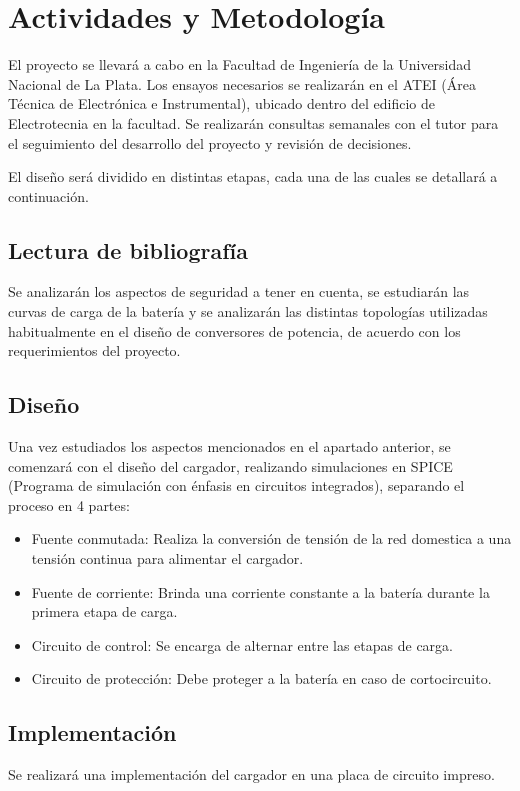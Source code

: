 \section{Actividades y Metodología}
El proyecto se llevará a cabo en la Facultad de Ingeniería de la Universidad Nacional de La Plata.
Los ensayos necesarios se realizarán en el ATEI (Área Técnica de Electrónica e Instrumental),
ubicado dentro del edificio de Electrotecnia en la facultad.
Se realizarán consultas semanales con el tutor para el seguimiento del desarrollo del proyecto y revisión de decisiones.

El diseño será dividido en distintas etapas, cada una de las cuales se detallará a continuación.

\subsection{Lectura de bibliografía}
Se analizarán los aspectos de seguridad a tener en cuenta,
se estudiarán las curvas de carga de la batería y
se analizarán las distintas topologías utilizadas habitualmente en el diseño de conversores de potencia,
de acuerdo con los requerimientos del proyecto.

\subsection{Diseño}
Una vez estudiados los aspectos mencionados en el apartado anterior,
se comenzará con el diseño del cargador,
realizando simulaciones en SPICE (Programa de simulación con énfasis en circuitos integrados),
separando el proceso en 4 partes:
\begin{itemize}
    \item Fuente conmutada: Realiza la conversión de tensión de la red domestica a una tensión continua para alimentar el cargador.
    \item Fuente de corriente: Brinda una corriente constante a la batería durante la primera etapa de carga.
    \item Circuito de control: Se encarga de alternar entre las etapas de carga.
    \item Circuito de protección: Debe proteger a la batería en caso de cortocircuito.
\end{itemize}

\subsection{Implementación}
Se realizará una implementación del cargador en una placa de circuito impreso.

